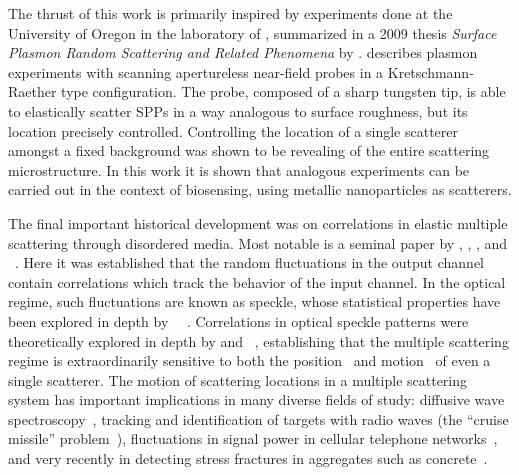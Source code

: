 The thrust of this work is primarily inspired by experiments done at the
University of Oregon in the laboratory of , summarized in a
2009 thesis \textit{Surface Plasmon Random Scattering and Related
Phenomena} \cite{schumann2009surface} by .  
describes plasmon experiments with scanning apertureless near-field probes
in a Kretschmann-Raether type configuration.  The probe, composed of a
sharp tungsten tip, is able to elastically scatter SPPs in a way analogous
to surface roughness, but its location precisely controlled.  Controlling
the location of a single scatterer amongst a fixed background was shown to
be revealing of the entire scattering microstructure.  In this work it is
shown that analogous experiments can be carried out in the context of
biosensing, using metallic nanoparticles as scatterers.

The final important historical development was on correlations in elastic
multiple scattering through disordered media.  Most notable is a seminal
paper by , , , and
~\cite{feng1988correlations}.  Here it was established that
the random fluctuations in the output channel contain correlations which
track the behavior of the input channel.  In the optical regime, such
fluctuations are known as speckle, whose statistical properties have been
explored in depth by
~\cite{goodman2007speckle}~\cite{goodman1975statistical}.
Correlations in optical speckle patterns were theoretically explored in
depth by  and ~\cite{berkovits1994correlations},
establishing that the multiple scattering regime is extraordinarily
sensitive to both the position~\cite{berkovits1990theory} and
motion~\cite{berkovits1991sensitivity} of even a single scatterer.  The
motion of scattering locations in a multiple scattering system
has important implications in many diverse fields of study:
diffusive wave spectroscopy~\cite{pine1988diffusing}, tracking and
identification of targets with radio waves (the ``cruise missile''
problem~\cite{atkins1991neural}), fluctuations in signal power in cellular
telephone networks~\cite{abdi2001estimation}, and very recently in
detecting stress fractures in aggregates such as
concrete~\cite{larose2010locating}.  
